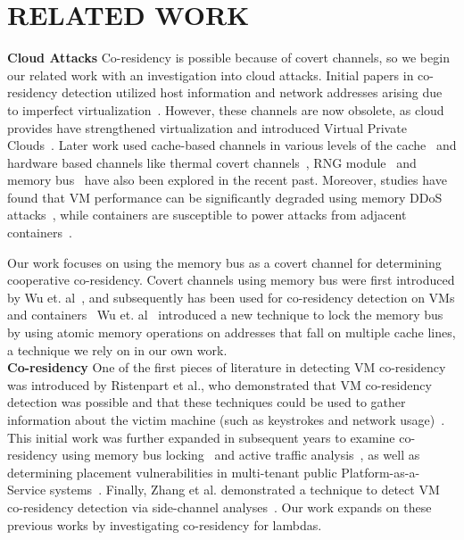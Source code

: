 \section{RELATED WORK}
\label{sec:relatedwork}

\noindent \textbf{Cloud Attacks} 
Co-residency is possible because of covert channels, so we begin our related
work with an investigation into cloud attacks. Initial
papers in co-residency detection utilized host information and network
addresses arising due to imperfect virtualization~\cite{ristenpartccs2009}.
However, these channels are now obsolete, as cloud provides have
strengthened virtualization and introduced Virtual Private
Clouds~\cite{awsvpc}. Later work used cache-based channels in various levels of
the cache~\cite{xuccsw2011, zhangccs2014, liu2015, kaylaap2016} and hardware
based channels like thermal covert channels~\cite{mastiusenix2015}, RNG
module~\cite{evtyushkinccs2016} and memory bus~\cite{wuusenix2012} have also
been explored in the recent past. Moreover, studies have found that VM
performance can be significantly degraded using memory DDoS
attacks~\cite{zhang2016memory}, while containers are susceptible to power
attacks from adjacent containers~\cite{gao2017}.  

Our work focuses on using the memory bus as a covert channel for determining
cooperative co-residency.  Covert channels using memory bus were first
introduced by Wu et. al~\cite{wuusenix2012}, and subsequently has been used for
co-residency detection on VMs and
containers~\cite{zhang2011,varad191016}  Wu et. al~\cite{wuusenix2012}
introduced a new technique to lock the memory bus by using atomic memory
operations on addresses that fall on multiple cache lines, a technique we rely
on in our own work. \\

\noindent \textbf{Co-residency} 
One of the first pieces of literature in detecting VM co-residency was
introduced by Ristenpart et al., who demonstrated that VM co-residency detection
was possible and that these techniques could be used to gather information about
the victim machine (such as keystrokes and network
usage)~\cite{ristenpartccs2009}. This initial work was further expanded in
subsequent years to examine co-residency using memory bus
locking~\cite{xuusenix2015} and active traffic analysis~\cite{bates2012}, as
well as determining placement vulnerabilities in multi-tenant public
Platform-as-a-Service systems~\cite{varadarajan2015, zhangpaas2016}. Finally,
Zhang et al. demonstrated a technique to detect VM co-residency detection via
side-channel analyses~\cite{zhang2011}. Our work expands on these previous works
by investigating co-residency for lambdas.\\

